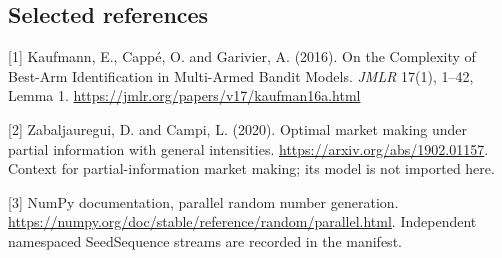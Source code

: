 \documentclass[11pt,a4paper]{article}
\begin{document}
\subsection*{Selected references}
{\small
[1] Kaufmann, E., Capp\'e, O. and Garivier, A. (2016). On the Complexity of
Best-Arm Identification in Multi-Armed Bandit Models. \emph{JMLR} 17(1), 1--42,
Lemma 1. \url{https://jmlr.org/papers/v17/kaufman16a.html}

[2] Zabaljauregui, D. and Campi, L. (2020). Optimal market making under partial information
with general intensities. \url{https://arxiv.org/abs/1902.01157}.
Context for partial-information market making; its model is not imported here.

[3] NumPy documentation, parallel random number generation.
\url{https://numpy.org/doc/stable/reference/random/parallel.html}.
Independent namespaced SeedSequence streams are recorded in the manifest.
}
\end{document}
